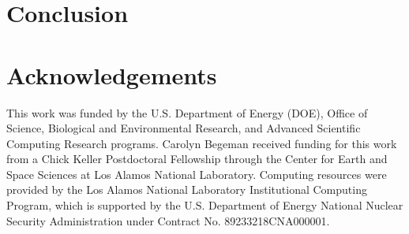 \documentclass[draft]{agujournal2019}
\begin{document}
\section{Conclusion}


\section{Acknowledgements}

This work was funded by the U.S. Department of Energy (DOE), Office of Science, Biological and Environmental Research, and Advanced Scientific Computing Research programs. Carolyn Begeman received funding for this work from a Chick Keller Postdoctoral Fellowship through the Center for Earth and Space Sciences at Los Alamos National Laboratory. Computing resources were provided by the Los Alamos National Laboratory Institutional Computing Program, which is supported by the U.S. Department of Energy National Nuclear Security Administration under Contract No. 89233218CNA000001.

\newpage

\end{document}
